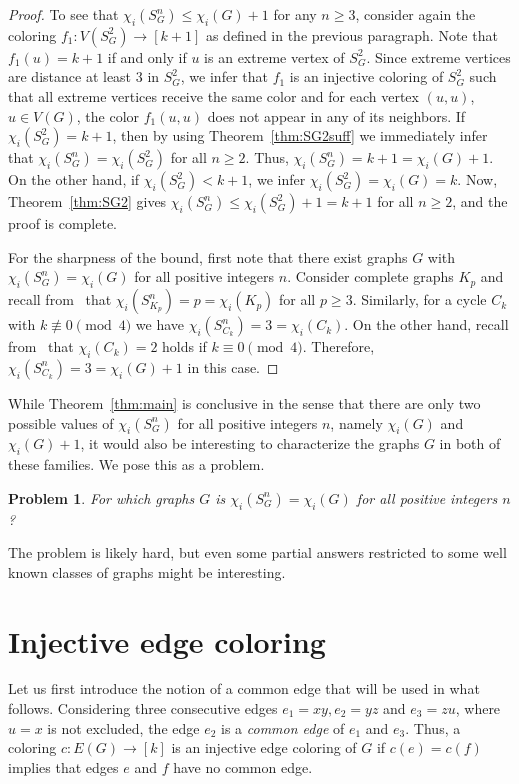 \documentclass{article}
\newtheorem{problem}{Problem}
\begin{document}
\begin{proof}
To see that $\chi_i(S_G^n)\le \chi_i(G)+1$ for any $n\ge 3$, consider again the coloring $f_1:V(S_G^2)\rightarrow [k+1]$ as defined in the previous paragraph.
Note that $f_1(u)=k+1$ if and only if $u$ is an extreme vertex of $S_G^2$. Since extreme vertices are distance at least $3$ in $S_G^2$, we infer that $f_1$ is an injective coloring of $S_G^2$ such that all extreme vertices receive the same color and for each vertex $(u,u)$, $u\in V(G)$, the color $f_1(u,u)$ does not appear in any of its neighbors. If $\chi_i(S_G^2)=k+1$, then by using Theorem~\ref{thm:SG2suff} we immediately infer that $\chi_i(S_G^n)= \chi_i(S_G^2)$ for all $n\geq 2$. Thus, $\chi_i(S_G^n)=k+1=\chi_i(G)+1$. On the other hand, if $\chi_i(S_G^2)<k+1$, we infer $\chi_i(S_G^2)=\chi_i(G)=k$. Now, Theorem~\ref{thm:SG2} gives $\chi_i(S_G^n)\le \chi_i(S_G^2)+1=k+1$ for all $n\ge 2$, and the proof is complete. 

For the sharpness of the bound, first note that there exist graphs $G$ with $\chi_i(S_G^n) = \chi_i(G)$ for all positive integers $n$. Consider complete graphs $K_p$ and recall from~\cite{bksy} that $\chi_i(S_{K_p}^n) = p = \chi_i(K_p)$ for all $p\ge 3$.  Similarly, for a cycle $C_k$ with $k\not\equiv 0 \pmod 4$ we have  $\chi_i(S_{C_k}^n) = 3 = \chi_i(C_k)$.
On the other hand, recall from~\cite{hkss} that $\chi_i(C_k)=2$ holds if $k\equiv 0 \pmod 4$. Therefore, $\chi_i(S_{C_k}^n) = 3=\chi_i(G)+1$ in this case.
\end{proof}

While Theorem~\ref{thm:main} is conclusive in the sense that there are only two possible values of $\chi_i(S_G^n)$ for all positive integers $n$, namely $\chi_i(G)$ and $\chi_i(G)+1$, it would also be interesting to characterize the graphs $G$ in both of these families. We pose this as a problem.

\begin{problem}
For which graphs $G$ is $\chi_i(S_G^n)=\chi_i(G)$ for all positive integers $n$?
\end{problem}

The problem is likely hard, but even some partial answers restricted to some well known classes of graphs might be interesting. 

\section{Injective edge coloring}
\label{sec:injedge}


Let us first introduce the notion of a common edge that will be used in what follows. Considering three consecutive edges $e_1=xy,e_2=yz$ and $e_3=zu$, where $u=x$ is not excluded, the edge $e_2$ is a {\em common edge} of $e_1$ and $e_3$. 
Thus, a coloring $c:E(G)\to [k]$ is an injective edge coloring of $G$ if $c(e)=c(f)$ implies that edges $e$ and $f$ have no common edge. 
\end{document}
